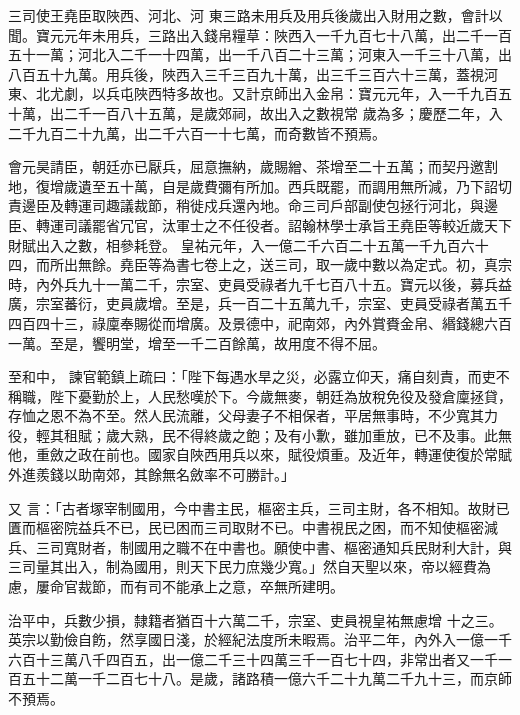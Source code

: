 \begin{pinyinscope}
 三司使王堯臣取陜西、河北、河
 東三路未用兵及用兵後歲出入財用之數，會計以聞。寶元元年未用兵，三路出入錢帛糧草：陜西入一千九百七十八萬，出二千一百五十一萬；河北入二千一十四萬，出一千八百二十三萬；河東入一千三十八萬，出八百五十九萬。用兵後，陜西入三千三百九十萬，出三千三百六十三萬，蓋視河東、北尤劇，以兵屯陜西特多故也。又計京師出入金帛：寶元元年，入一千九百五十萬，出二千一百八十五萬，是歲郊祠，故出入之數視常
 歲為多；慶歷二年，入二千九百二十九萬，出二千六百一十七萬，而奇數皆不預焉。



 會元昊請臣，朝廷亦已厭兵，屈意撫納，歲賜繒、茶增至二十五萬；而契丹邀割地，復增歲遺至五十萬，自是歲費彌有所加。西兵既罷，而調用無所減，乃下詔切責邊臣及轉運司趣議裁節，稍徙戍兵還內地。命三司戶部副使包拯行河北，與邊臣、轉運司議罷省冗官，汰軍士之不任役者。詔翰林學士承旨王堯臣等較近歲天下財賦出入之數，相參耗登。
 皇祐元年，入一億二千六百二十五萬一千九百六十四，而所出無餘。堯臣等為書七卷上之，送三司，取一歲中數以為定式。初，真宗時，內外兵九十一萬二千，宗室、吏員受祿者九千七百八十五。寶元以後，募兵益廣，宗室蕃衍，吏員歲增。至是，兵一百二十五萬九千，宗室、吏員受祿者萬五千四百四十三，祿廩奉賜從而增廣。及景德中，祀南郊，內外賞賚金帛、緡錢總六百一萬。至是，饗明堂，增至一千二百餘萬，故用度不得不屈。



 至和中，
 諫官範鎮上疏曰：「陛下每遇水旱之災，必露立仰天，痛自刻責，而吏不稱職，陛下憂勤於上，人民愁嘆於下。今歲無麥，朝廷為放稅免役及發倉廩拯貸，存恤之恩不為不至。然人民流離，父母妻子不相保者，平居無事時，不少寬其力役，輕其租賦；歲大熟，民不得終歲之飽；及有小歉，雖加重放，已不及事。此無他，重斂之政在前也。國家自陜西用兵以來，賦役煩重。及近年，轉運使復於常賦外進羨錢以助南郊，其餘無名斂率不可勝計。」



 又
 言：「古者塚宰制國用，今中書主民，樞密主兵，三司主財，各不相知。故財已匱而樞密院益兵不已，民已困而三司取財不已。中書視民之困，而不知使樞密減兵、三司寬財者，制國用之職不在中書也。願使中書、樞密通知兵民財利大計，與三司量其出入，制為國用，則天下民力庶幾少寬。」然自天聖以來，帝以經費為慮，屢命官裁節，而有司不能承上之意，卒無所建明。



 治平中，兵數少損，隸籍者猶百十六萬二千，宗室、吏員視皇祐無慮增
 十之三。英宗以勤儉自飭，然享國日淺，於經紀法度所未暇焉。治平二年，內外入一億一千六百十三萬八千四百五，出一億二千三十四萬三千一百七十四，非常出者又一千一百五十二萬一千二百七十八。是歲，諸路積一億六千二十九萬二千九十三，而京師不預焉。




\end{pinyinscope}

